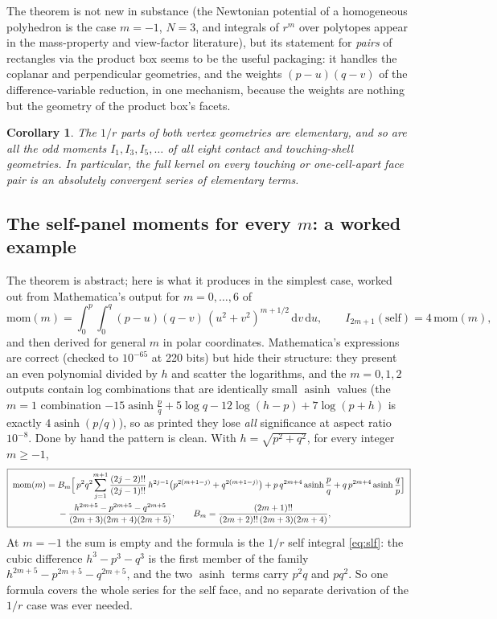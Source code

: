 \documentclass[11pt]{article}
\newtheorem{corollary}[theorem]{Corollary}
\theoremstyle{remark}
\newcommand{\dd}{\mathrm{d}}
\newcommand{\asinh}{\operatorname{asinh}}
\begin{document}
The theorem is not new in substance (the Newtonian potential of a homogeneous
polyhedron is the case $m=-1$, $N=3$, and integrals of $r^m$ over polytopes appear in
the mass-property and view-factor literature), but its statement for
\emph{pairs} of rectangles via the product box seems to be the useful packaging: it
handles the coplanar and perpendicular geometries, and the weights $(p-u)(q-v)$ of the
difference-variable reduction, in one mechanism, because the weights are nothing but
the geometry of the product box's facets.

\begin{corollary}
The $1/r$ parts of both vertex geometries are elementary, and so are all the odd
moments $I_1, I_3, I_5,\ldots$ of all eight contact and touching-shell geometries. In
particular, the full kernel on every touching or one-cell-apart face pair is an
absolutely convergent series of elementary terms.
\end{corollary}


\subsection{The self-panel moments for every $m$: a worked example}
\label{sec:momall}

The theorem is abstract; here is what it produces in the simplest case, worked out
from Mathematica's output for $m = 0,\ldots,6$ of
\begin{equation}
\mathrm{mom}(m) = \int_0^p\!\!\int_0^q (p-u)(q-v)\,(u^2+v^2)^{m+1/2}\,\dd v\,\dd u,
\qquad I_{2m+1}(\text{self}) = 4\,\mathrm{mom}(m),
\end{equation}
and then derived for general $m$ in polar coordinates. Mathematica's expressions are
correct (checked to $10^{-65}$ at 220 bits) but hide their structure: they present an
even polynomial divided by $h$ and scatter the logarithms, and the $m = 0, 1, 2$
outputs contain log combinations that are identically small $\asinh$ values (the
$m=1$ combination $-15\asinh\frac{p}{q} + 5\log q - 12\log(h-p) + 7\log(p+h)$ is
exactly $4\asinh(p/q)$), so as printed they lose \emph{all} significance at aspect
ratio $10^{-8}$. Done by hand the pattern is clean. With $h = \sqrt{p^2+q^2}$, for every
integer $m \ge -1$,
{\small
\begin{equation}
\boxed{\;
\begin{aligned}
\mathrm{mom}(m) = {}& B_m\Bigl[\, p^2 q^2 \!\sum_{j=1}^{m+1} \frac{(2j-2)!!}{(2j-1)!!}\, h^{2j-1}\bigl(p^{2(m+1-j)} + q^{2(m+1-j)}\bigr)
+ p\,q^{2m+4}\asinh\frac{p}{q} + q\,p^{2m+4}\asinh\frac{q}{p} \Bigr] \\
& - \frac{h^{2m+5} - p^{2m+5} - q^{2m+5}}{(2m+3)(2m+4)(2m+5)},
\qquad
B_m = \frac{(2m+1)!!}{(2m+2)!!\,(2m+3)(2m+4)},
\end{aligned}\;}
\label{eq:momgen}
\end{equation}}
\vspace{-6pt}
At $m = -1$ the sum is empty and the formula is the $1/r$ self integral
\eqref{eq:slf}: the cubic difference $h^3 - p^3 - q^3$ is the first member of the
family $h^{2m+5} - p^{2m+5} - q^{2m+5}$, and the two $\asinh$ terms carry
$p^2 q$ and $p q^2$. So one formula covers the whole series for the self face, and no
separate derivation of the $1/r$ case was ever needed.
\end{document}
